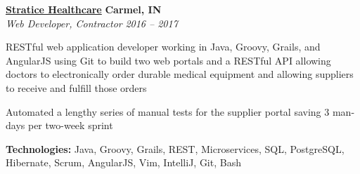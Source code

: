 %
    \headerrow
        {\textbf{\href{https://www.straticehealthcare.com/}{Stratice Healthcare}}}
        {\textbf{Carmel, IN}}
    \\
    \headerrow
        {\emph{Web Developer, Contractor}}
        {\emph{2016 -- 2017}}
    \begin{itemize*}
        \item RESTful web application developer working in Java, Groovy, Grails, and AngularJS using Git to build two
            web portals and a RESTful API allowing doctors to electronically order durable medical equipment and
            allowing suppliers to receive and fulfill those orders
        \item Automated a lengthy series of manual tests for the supplier portal saving 3 man-days per two-week sprint
    \end{itemize*}

    \hspace{1.0em}
        {\textbf{Technologies:} Java, Groovy, Grails, REST, Microservices, SQL, PostgreSQL, Hibernate, Scrum, AngularJS, Vim, IntelliJ, Git, Bash}
